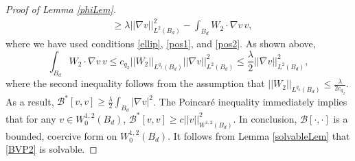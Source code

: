 \documentclass[12pt,reqno]{amsart}
\theoremstyle{plain}
\theoremstyle{definition}
\newcommand{\la}{\lambda}
\newcommand{\gr}{\nabla}
\newcommand{\norm}[1]{\left\vert \left\vert #1\right\vert\right\vert}
\newcommand{\abs}[1]{\left\vert#1\right\vert}
\newcommand{\brac}[1]{\left[#1\right]}
\newcommand{\pr}[1]{\left( #1 \right) }
\begin{document}
\begin{proof}[Proof of Lemma \ref{phiLem}]
\begin{align*}
&\ge \la  \norm{\gr v}_{L^2\pr{B_d}}^2
- \int_{B_d}  W_2 \cdot \gr v \, v ,
\end{align*}
where we have used conditions \eqref{ellip}, \eqref{pos1}, and \eqref{pos2}.
As shown above, 
$$\int_{B_d}  W_2 \cdot \gr v \, v \le c_{q_2} \norm{W_2}_{L^{q_2}\pr{B_d}} \norm{\gr v}_{L^2\pr{B_d}}^2 \le \frac \la 2 \norm{\gr v}_{L^2\pr{B_d}}^2,$$
where the second inequality follows from the assumption that $\norm{W_2}_{L^{q_2}\pr{B_d}} \le \frac{\la}{2 c_{q_2}}$.
As a result, $\mathcal B^*\brac{v, v} \ge \frac \la 2 \int_{B_d} \abs{\gr v}^2$.
The Poincar\'e inequality immediately implies that for any $v \in W^{1,2}_0\pr{B_d}$, $\mathcal B^*\brac{v, v} \ge c \norm{v}_{W^{1,2}\pr{B_d}}^2$.
In conclusion, $\mathcal B\brac{\cdot, \cdot}$ is a bounded, coercive form on $W^{1,2}_0\pr{B_d}$.
It follows from Lemma \ref{solvableLem} that \eqref{BVP2} is solvable.


\end{proof}
\end{document}
